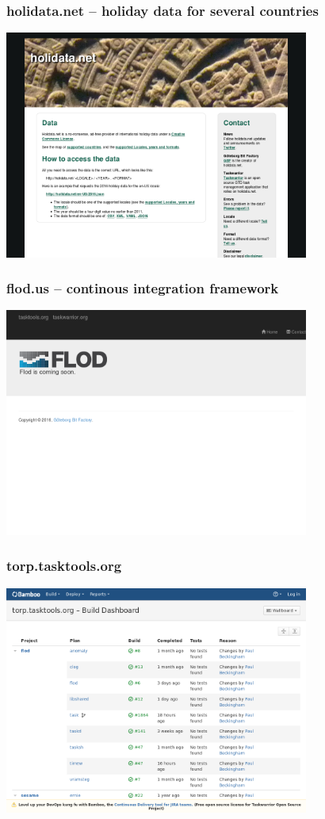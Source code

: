 \documentclass[t,handout]{beamer}
\begin{document}
\begin{frame}\frametitle{holidata.net -- holiday data for several countries}
    \begin{center}
        \href{http://holidata.net/}{\includegraphics[width=10cm,height=7.5cm]{holidata-net.png}}
    \end{center}
\end{frame}

\begin{frame}\frametitle{flod.us -- continous integration framework}
    \begin{center}
        \href{http://flod.us/}{\includegraphics[width=10cm,height=7.5cm]{flod-us.png}}
    \end{center}
\end{frame}

\begin{frame}\frametitle{torp.tasktools.org}
    \begin{center}
        \href{https://torp.tasktools.org}{\includegraphics[width=10cm,height=7.5cm]{torp-tasktools-org.png}}
    \end{center}
\end{frame}
\end{document}

